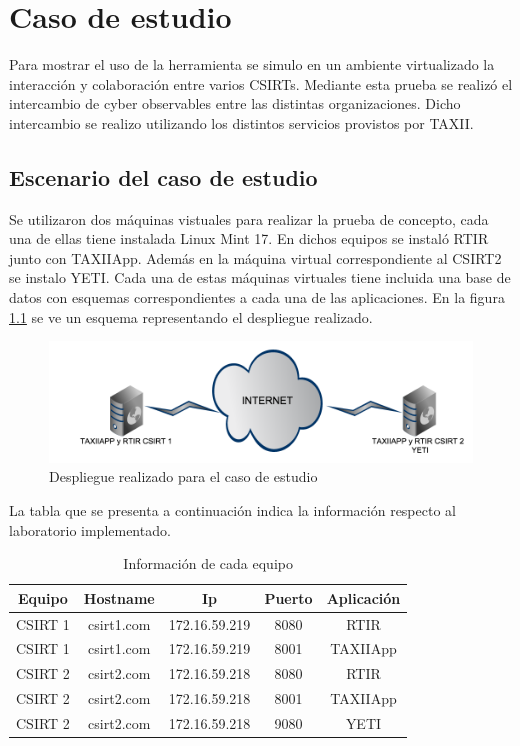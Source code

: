\chapter{Caso de estudio}
\label{capitulo6}
Para mostrar el uso de la herramienta se simulo en un ambiente virtualizado la interacción y colaboración entre varios CSIRTs. Mediante esta prueba se realizó el intercambio de cyber observables entre las distintas organizaciones. Dicho intercambio se realizo utilizando los distintos servicios provistos por TAXII.

\section{Escenario del caso de estudio}
Se utilizaron dos máquinas vistuales para realizar la prueba de concepto, cada una de ellas tiene instalada Linux Mint 17. En dichos equipos se instaló RTIR junto con TAXIIApp. Además en la máquina virtual correspondiente al CSIRT2 se instalo YETI. Cada una de estas máquinas virtuales tiene incluida una base de datos con esquemas correspondientes a cada una de las aplicaciones. En la figura \ref{fig.laboratorio_desplegado} se ve un esquema representando el despliegue realizado.

\begin{figure}[h!]
	\label{fig.laboratorio_desplegado}
	\centering
	\includegraphics[scale=0.4]{caso-de-estudio/laboratorioDesplegado.png}
	\caption{Despliegue realizado para el caso de estudio}
\end{figure}

La tabla que se presenta a continuación indica la información respecto al laboratorio implementado.
\renewcommand{\tablename}{Tabla}

\begin{table}
	\begin{center}
		\begin{tabular}{|c|c|c|c|c|}
			\hline
			Equipo & Hostname & Ip & Puerto & Aplicación \\ \hline
			CSIRT 1 & csirt1.com & 172.16.59.219 & 8080 & RTIR \\ \hline
			CSIRT 1 & csirt1.com & 172.16.59.219 & 8001 & TAXIIApp \\ \hline
			CSIRT 2 & csirt2.com & 172.16.59.218 & 8080 & RTIR \\ \hline
			CSIRT 2 & csirt2.com & 172.16.59.218 & 8001 & TAXIIApp \\ \hline
			CSIRT 2 & csirt2.com & 172.16.59.218 & 9080 & YETI \\ \hline
		\end{tabular}
	\end{center}
	\caption{Información de cada equipo}
	\label{tabla_equipos}
\end{table}


